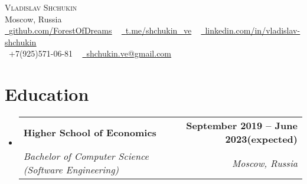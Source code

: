 \documentclass[letterpaper,11pt]{article}
\makeatletter
\newcommand{\resumeSubheading}[4]{
  \vspace{-2pt}\item
    \begin{tabular*}{1.0\textwidth}[t]{l@{\extracolsep{\fill}}r}
      \textbf{#1} & \textbf{\small #2} \\
      \textit{\small#3} & \textit{\small #4} \\
    \end{tabular*}\vspace{-7pt}
}
\newcommand{\resumeSubHeadingListStart}{\begin{itemize}[leftmargin=0.0in, label={}]}
\newcommand{\resumeSubHeadingListEnd}{\end{itemize}}
\makeatother
\begin{document}

\begin{center}
    {\Huge \scshape Vladislav Shchukin} \\ \vspace{1pt}
    Moscow, Russia \\ \vspace{1pt}
    \small
    \href{https://github.com/ForestOfDreams}{\raisebox{-0.2\height}\faGithub\ \underline{github.com/ForestOfDreams}} ~
    \href{https://t.me/shchukin_ve}{\raisebox{-0.2\height}\faTelegram\ \underline{t.me/shchukin\_ve}} ~
    \href{https://linkedin.com/in/vladislav-shchukin/}{\raisebox{-0.2\height}\faLinkedin\ \underline{linkedin.com/in/vladislav-shchukin}} 
    \\
    \vspace{2pt}
    \faPhone\ +7(925)571-06-81 ~ 
    \href{mailto:shchukin_ve@gmail.com}{\raisebox{-0.2\height}\faEnvelope\  \underline{shchukin.ve@gmail.com}} ~ 
    \vspace{-8pt}
\end{center}

\section{Education}
  \resumeSubHeadingListStart
    \resumeSubheading
      {Higher School of Economics}{September 2019 -- June 2023(expected)}
      {Bachelor of Computer Science (Software Engineering) }{Moscow, Russia}
  \resumeSubHeadingListEnd
\end{document}
